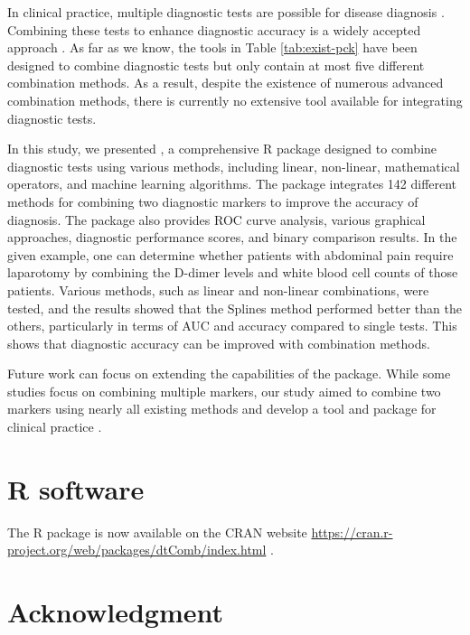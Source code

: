 In clinical practice, multiple diagnostic tests are possible for disease diagnosis \citep{yu2015two}. Combining these tests to enhance diagnostic accuracy is a widely accepted approach \citep{su1993linear, pepe2000combining, liu2011min, sameera2016binary, pepe2006combining, todor2014tools}. As far as we know, the tools in Table \ref{tab:exist-pck} have been designed to combine diagnostic tests but only contain at most five different combination methods. As a result, despite the existence of numerous advanced combination methods, there is currently no extensive tool available for integrating diagnostic tests.

In this study, we presented , a comprehensive R package designed to combine diagnostic tests using various methods, including linear, non-linear, mathematical operators, and machine learning algorithms. The package integrates 142 different methods for combining two diagnostic markers to improve the accuracy of diagnosis. The package also provides ROC curve analysis, various graphical approaches, diagnostic performance scores, and binary comparison results. In the given example, one can determine whether patients with abdominal pain require laparotomy by combining the D-dimer levels and white blood cell counts of those patients. Various methods, such as linear and non-linear combinations, were tested, and the results showed that the Splines method performed better than the others, particularly in terms of AUC and accuracy compared to single tests. This shows that diagnostic accuracy can be improved with combination methods.

Future work can focus on extending the capabilities of the  package. While some studies focus on combining multiple markers, our study aimed to combine two markers using nearly all existing methods and develop a tool and package for clinical practice \citep{kang2016linear}.

\section{R software}\label{r-software}

The R package  is now available on the CRAN website \url{https://cran.r-project.org/web/packages/dtComb/index.html} \citep{dtCombManuel}.

\section{Acknowledgment}\label{acknowledgment}

